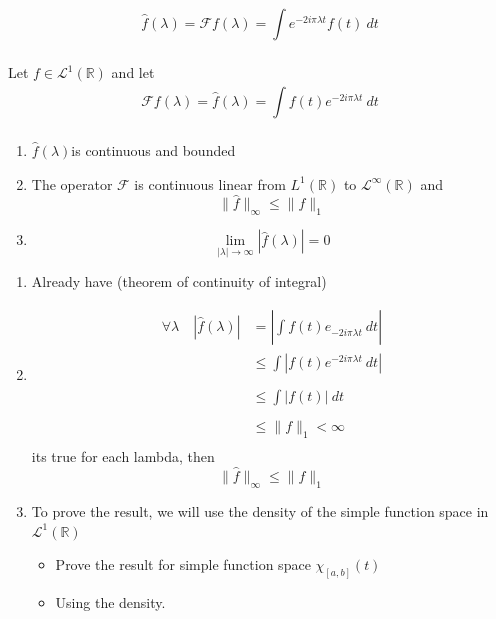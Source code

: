 \begin{defn}[]
    \[
        \widehat{f}\left( \lambda \right) = \mathscr{ F } f(\lambda ) = \int\limits_{ }^{ }
        e _{  }^{ -2i\pi\lambda t } f(t) \ dt
    \]
    \label{def:}
\end{defn}

\begin{ftheo}
    Let $ f \in \mathscr{ L } ^1( \mathbb{R})    $ and let 
    \[
        \mathscr{ F } f(\lambda) = \widehat{f}\left( \lambda \right) = \int\limits_{ }^{ }
        f(t) e _{  }^{ -2i\pi \lambda t } \ dt
    \]
    \begin{enumerate}
        \item $ \widehat{f}\left( \lambda\right)  $is continuous and bounded 
        \item The operator $ \mathscr{ F }  $ is continuous linear from $ L^1( \mathbb{R})
            $ to $ \mathscr{ L } ^{\infty} ( \mathbb{R})  $ and 
            \[ \| \widehat{f}  \|^{ }_{\infty} \leq \| f \|^{ }_{ 1}  \]
        \item \[
                \lim _{ \left | \lambda  \right | \to \infty  }^{  } \left | \widehat{f}
                \left( \lambda \right) \right | = 0
        \]
    \end{enumerate}
    \label{th:Riemann-Lebesgue}
\end{ftheo}

\begin{enumerate}
    \item Already have (theorem of continuity of integral)  
    \item 
        \begin{align*}
            \forall \lambda \quad \left | \widehat{f}\left( \lambda\right)  \right |  &= 
            \left | \int\limits_{ }^{ } f(t) e _{ -2i\pi \lambda t }^{  } \ dt \right | \\
             &\leq \int\limits_{ }^{ } \left | f(t) e _{  }^{ -2i\pi\lambda t } \ dt
             \right |  \\ 
             &\leq \int\limits_{ }^{ } \left | f(t) \right | \ dt \\
              &\leq \| f \|^{ }_{ 1} < \infty  \\ 
        \end{align*}
        its true for each lambda, then 
        \[
            \| \widehat{f} \|^{ }_{ \infty } \leq \| f \|^{ }_{ 1} 
        \]
    \item To prove the result, we will use the density of the simple function space in $
        \mathscr{ L } ^1( \mathbb{R}) $ 
        \begin{itemize}
            \item Prove the result for simple function space $ \chi _{ [a,b] }^{  } (t) $
          \item Using the density.  
      \end{itemize}
\end{enumerate}

